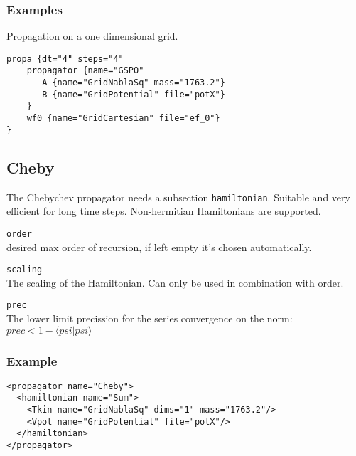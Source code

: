 \documentclass[a4paper,12pt]{scrbook}
\newcommand{\option}[2]{\item \texttt{#1}\\ #2}
\begin{document}
\subsubsection*{Examples}
Propagation on a one dimensional grid.
\begin{verbatim}
propa {dt="4" steps="4"
    propagator {name="GSPO"
       A {name="GridNablaSq" mass="1763.2"}
       B {name="GridPotential" file="potX"}
    }
    wf0 {name="GridCartesian" file="ef_0"}
}
\end{verbatim}

\subsection{Cheby}
The Chebychev propagator \cite{Ezer84} needs a subsection \verb|hamiltonian|.
Suitable and very efficient for long time steps. Non-hermitian Hamiltonians are supported.
\begin{options}
 \option{order}{desired max order of recursion, if left empty it's chosen automatically.}
 \option{scaling}{The scaling of the Hamiltonian. Can only be used in combination with order.}
 \option{prec}{The lower limit precission for the series convergence on the norm: $prec < 1-\langle psi|psi \rangle$}
\end{options}

\subsubsection*{Example}
\begin{verbatim}
<propagator name="Cheby">
  <hamiltonian name="Sum">
    <Tkin name="GridNablaSq" dims="1" mass="1763.2"/>
    <Vpot name="GridPotential" file="potX"/>
  </hamiltonian>
</propagator>
\end{verbatim}
\end{document}
